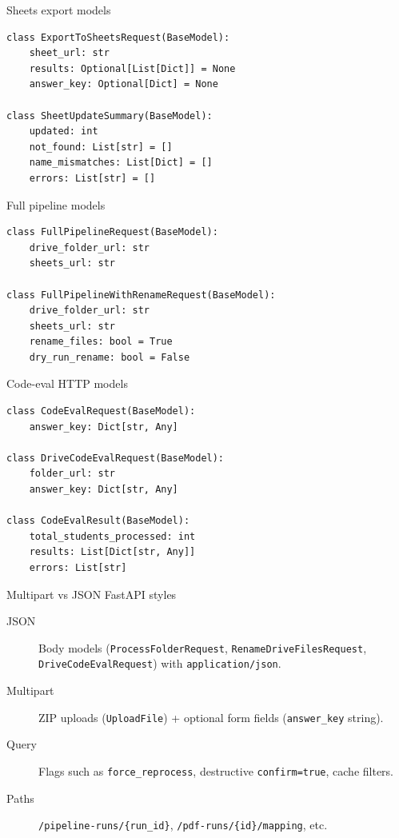\documentclass[aspectratio=169]{beamer}
\begin{document}
\begin{frame}[fragile]{Sheets export models}
\begin{lstlisting}[style=pys]
class ExportToSheetsRequest(BaseModel):
    sheet_url: str
    results: Optional[List[Dict]] = None
    answer_key: Optional[Dict] = None

class SheetUpdateSummary(BaseModel):
    updated: int
    not_found: List[str] = []
    name_mismatches: List[Dict] = []
    errors: List[str] = []
\end{lstlisting}
\end{frame}

\begin{frame}[fragile]{Full pipeline models}
\begin{lstlisting}[style=pys]
class FullPipelineRequest(BaseModel):
    drive_folder_url: str
    sheets_url: str

class FullPipelineWithRenameRequest(BaseModel):
    drive_folder_url: str
    sheets_url: str
    rename_files: bool = True
    dry_run_rename: bool = False
\end{lstlisting}
\end{frame}

\begin{frame}[fragile]{Code-eval HTTP models}
\begin{lstlisting}[style=pys]
class CodeEvalRequest(BaseModel):
    answer_key: Dict[str, Any]

class DriveCodeEvalRequest(BaseModel):
    folder_url: str
    answer_key: Dict[str, Any]

class CodeEvalResult(BaseModel):
    total_students_processed: int
    results: List[Dict[str, Any]]
    errors: List[str]
\end{lstlisting}
\end{frame}

\begin{frame}{Multipart vs JSON FastAPI styles}
  \small
  \begin{description}
    \item[JSON] Body models (\texttt{ProcessFolderRequest}, \texttt{RenameDriveFilesRequest}, \texttt{DriveCodeEvalRequest}) with \texttt{application/json}.
    \item[Multipart] ZIP uploads (\texttt{UploadFile}) + optional form fields (\texttt{answer\_key} string).
    \item[Query] Flags such as \texttt{force\_reprocess}, destructive \texttt{confirm=true}, cache filters.
    \item[Paths] \texttt{/pipeline-runs/\{run\_id\}}, \texttt{/pdf-runs/\{id\}/mapping}, etc.
  \end{description}
\end{frame}
\end{document}
